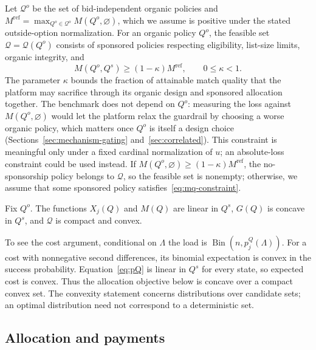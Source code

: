 \documentclass[opre,dblanonrev]{informs4}
\providecommand{\1}{\mathbf{1}}
\begin{document}
Let $\mathcal Q^o$ be the set of bid-independent organic policies and $M^{\mathrm{ref}}=\max_{Q^o\in\mathcal Q^o}M(Q^o,\varnothing)$, which we assume is positive under the stated outside-option normalization. For an organic policy $Q^o$, the feasible set $\mathcal Q=\mathcal Q(Q^o)$ consists of sponsored policies respecting eligibility, list-size limits, organic integrity, and
\begin{equation}\label{eq:mq-constraint}
M(Q^o,Q^s)\ge(1-\kappa)M^{\mathrm{ref}},\qquad 0\le\kappa<1.
\end{equation}
The parameter $\kappa$ bounds the fraction of attainable match quality that the platform may sacrifice through its organic design and sponsored allocation together. The benchmark does not depend on $Q^o$: measuring the loss against $M(Q^o,\varnothing)$ would let the platform relax the guardrail by choosing a worse organic policy, which matters once $Q^o$ is itself a design choice (Sections~\ref{sec:mechanism-gating} and~\ref{sec:correlated}). This constraint is meaningful only under a fixed cardinal normalization of $u$; an absolute-loss constraint could be used instead. If $M(Q^o,\varnothing)\ge(1-\kappa)M^{\mathrm{ref}}$, the no-sponsorship policy belongs to $\mathcal Q$, so the feasible set is nonempty; otherwise, we assume that some sponsored policy satisfies~\eqref{eq:mq-constraint}.

\begin{lemma}[Convexity]\label{lem:convexity}
Fix $Q^o$. The functions $X_j(Q)$ and $M(Q)$ are linear in $Q^s$, $G(Q)$ is concave in $Q^s$, and $\mathcal Q$ is compact and convex.
\end{lemma}

To see the cost argument, conditional on $\Lambda$ the load is $\operatorname{Bin}(n,p_j^Q(\Lambda))$. For a cost with nonnegative second differences, its binomial expectation is convex in the success probability. Equation~\eqref{eq:pQ} is linear in $Q^s$ for every state, so expected cost is convex. Thus the allocation objective below is concave over a compact convex set. The convexity statement concerns distributions over candidate sets; an optimal distribution need not correspond to a deterministic set.

\subsection{Allocation and payments}\label{sec:model-mechanism}
\end{document}

